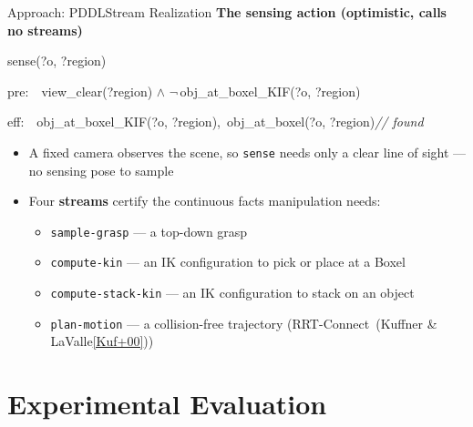 \documentclass[aspectratio=169, 11pt]{beamer}
\newcommand{\subhead}[1]{{\color{i6blue}\bfseries #1}\par\medskip}
\newcommand{\rc}[2]{{\footnotesize\,(#1\;\hyperlink{ref:#2}{{\color{i6blue!60}[#2]}})}}
\begin{document}
\begin{frame}{Approach: PDDLStream Realization}
  \subhead{The sensing action (optimistic, calls no streams)}
  {\footnotesize\ttfamily
   sense(?o, ?region)\par
   \hspace{3mm}pre:\ \ view\_clear(?region) $\wedge$ $\neg$\,obj\_at\_boxel\_KIF(?o, ?region)\par
   \hspace{3mm}eff:\ \ obj\_at\_boxel\_KIF(?o, ?region),\ obj\_at\_boxel(?o, ?region)\hfill\textrm{\itshape\color{gray}// found}\par
  }
  \medskip
  \begin{itemize}[<+->]
    \item A fixed camera observes the scene, so \texttt{sense} needs only a clear
          line of sight --- no sensing pose to sample
    \item Four \textbf{streams} certify the continuous facts manipulation needs:
      \begin{itemize}[<+->]
        \item \texttt{sample-grasp} --- a top-down grasp
        \item \texttt{compute-kin} --- an IK configuration to pick or place at a Boxel
        \item \texttt{compute-stack-kin} --- an IK configuration to stack on an object
        \item \texttt{plan-motion} --- a collision-free trajectory (RRT-Connect
              \rc{Kuffner \& LaValle}{Kuf+00})
      \end{itemize}
  \end{itemize}
\end{frame}

\section{Experimental Evaluation}
\end{document}
